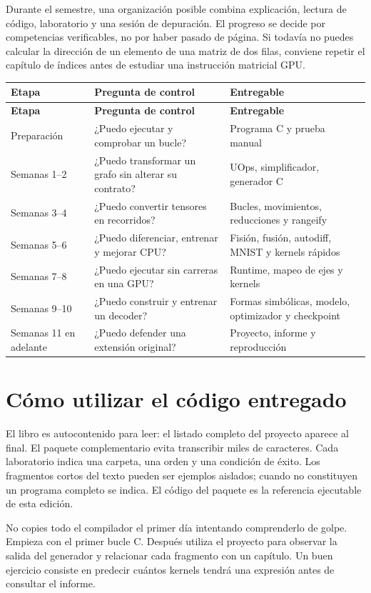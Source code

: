 \documentclass[12pt,a4paper,oneside]{report}
\begin{document}
Durante el semestre, una organización posible combina explicación, lectura de código, laboratorio y una sesión de depuración. El progreso se decide por competencias verificables, no por haber pasado de página. Si todavía no puedes calcular la dirección de un elemento de una matriz de dos filas, conviene repetir el capítulo de índices antes de estudiar una instrucción matricial GPU.

{\small
\begin{longtable}{@{}P{0.28\textwidth}P{0.32\textwidth}P{0.34\textwidth}@{}}
\toprule
\textbf{Etapa} & \textbf{Pregunta de control} & \textbf{Entregable}\\
\midrule
\endfirsthead
\toprule
\textbf{Etapa} & \textbf{Pregunta de control} & \textbf{Entregable}\\
\midrule
\endhead
Preparación & ¿Puedo ejecutar y comprobar un bucle? & Programa C y prueba manual\\
Semanas 1--2 & ¿Puedo transformar un grafo sin alterar su contrato? & UOps, simplificador, generador C\\
Semanas 3--4 & ¿Puedo convertir tensores en recorridos? & Bucles, movimientos, reducciones y rangeify\\
Semanas 5--6 & ¿Puedo diferenciar, entrenar y mejorar CPU? & Fisión, fusión, autodiff, MNIST y kernels rápidos\\
Semanas 7--8 & ¿Puedo ejecutar sin carreras en una GPU? & Runtime, mapeo de ejes y kernels\\
Semanas 9--10 & ¿Puedo construir y entrenar un decoder? & Formas simbólicas, modelo, optimizador y checkpoint\\
Semanas 11 en adelante & ¿Puedo defender una extensión original? & Proyecto, informe y reproducción\\
\bottomrule
\end{longtable}
}
\section{Cómo utilizar el código entregado}
El libro es autocontenido para leer: el listado completo del proyecto aparece al final. El paquete complementario evita transcribir miles de caracteres. Cada laboratorio indica una carpeta, una orden y una condición de éxito. Los fragmentos cortos del texto pueden ser ejemplos aislados; cuando no constituyen un programa completo se indica. El código del paquete es la referencia ejecutable de esta edición.

No copies todo el compilador el primer día intentando comprenderlo de golpe. Empieza con el primer bucle C. Después utiliza el proyecto para observar la salida del generador y relacionar cada fragmento con un capítulo. Un buen ejercicio consiste en predecir cuántos kernels tendrá una expresión antes de consultar el informe.
\end{document}
